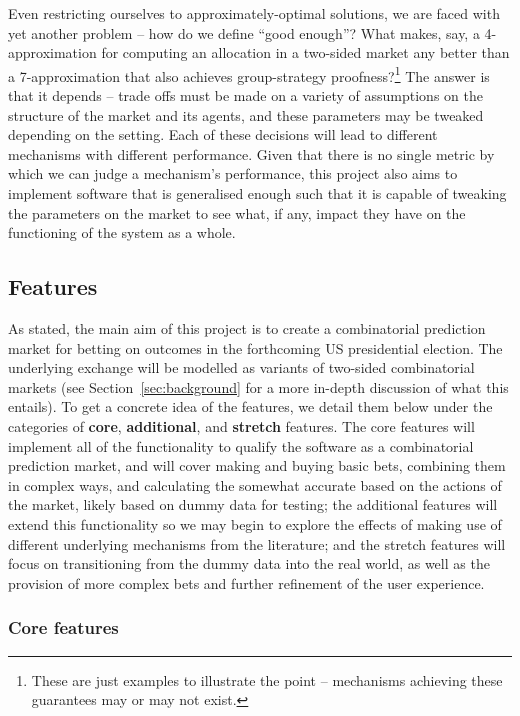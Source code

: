 \documentclass[10pt,a4paper]{article}
\theoremstyle{plain}
\theoremstyle{definition}
\begin{document}
	Even restricting ourselves to approximately-optimal solutions, we are faced
	with yet another problem -- how do we define ``good enough''? What makes,
	say, a 4-approximation for computing an allocation in a two-sided market
	any better than a 7-approximation that also achieves group-strategy
	proofness?\footnote{These are just examples to illustrate the point --
	mechanisms achieving these guarantees may or may not exist.} The answer is
	that it depends -- trade offs must be made on a variety of assumptions on
	the structure of the market and its agents, and these parameters may be
	tweaked depending on the setting. Each of these decisions will lead to
	different mechanisms with different performance. Given that there is no
	single metric by which we can judge a mechanism's performance, this project
	also aims to implement software that is generalised enough such that it is
	capable of tweaking the parameters on the market to see what, if any,
	impact they have on the functioning of the system as a whole.

	\subsection{Features}

	As stated, the main aim of this project is to create a combinatorial
	prediction market for betting on outcomes in the forthcoming US
	presidential election. The underlying exchange will be modelled as variants
	of two-sided combinatorial markets (see Section~\ref{sec:background} for a
	more in-depth discussion of what this entails). To get a concrete idea of
	the features, we detail them below under the categories of \textbf{core},
	\textbf{additional}, and \textbf{stretch} features. The core features will
	implement all of the functionality to qualify the software as a
	combinatorial prediction market, and will cover making and buying basic
	bets, combining them in complex ways, and calculating the somewhat accurate
	based on the actions of the market, likely based on dummy data for testing;
	the additional features will extend this functionality so we may begin to
	explore the effects of making use of different underlying mechanisms from
	the literature; and the stretch features will focus on transitioning from
	the dummy data into the real world, as well as the provision of more
	complex bets and further refinement of the user experience.

	\subsubsection{Core features}
\end{document}
